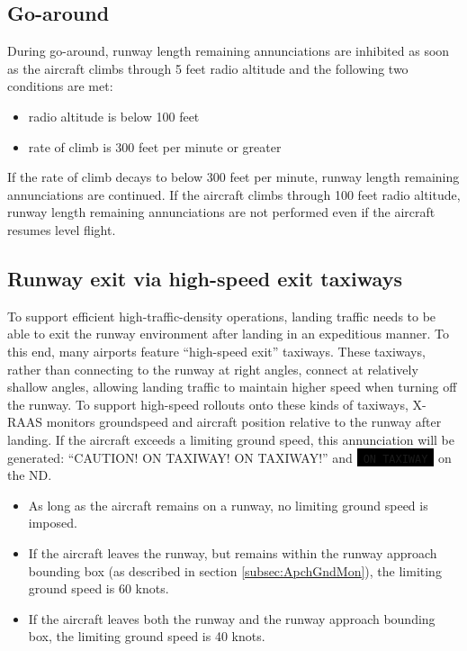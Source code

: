 \documentclass[a4paper,12pt]{article}
\newcommand{\visualadvisory}[3][b]{%
    \ifthenelse{\equal{#1}{b}}{\begin{center}}{}
    \noindent
    \colorbox{black}{\textcolor{#2visualadvisorycolor}{\large\texttt{~#3~}}}
    \ifthenelse{\equal{#1}{b}}{\end{center}}{}}
\begin{document}
\subsection{Go-around}
\label{subsec:GoAround}

During go-around, runway length remaining annunciations are inhibited as
soon as the aircraft climbs through 5 feet radio altitude and the
following two conditions are met:

\begin{itemize}

\item radio altitude is below 100 feet

\item rate of climb is 300 feet per minute or greater

\end{itemize}

\noindent If the rate of climb decays to below 300 feet per minute,
runway length remaining annunciations are continued. If the aircraft
climbs through 100 feet radio altitude, runway length remaining
annunciations are not performed even if the aircraft resumes level
flight.

\subsection{Runway exit via high-speed exit taxiways}
\label{subsec:HighSpeedExit}

To support efficient high-traffic-density operations, landing traffic
needs to be able to exit the runway environment after landing in an
expeditious manner. To this end, many airports feature ``high-speed
exit'' taxiways. These taxiways, rather than connecting to the runway at
right angles, connect at relatively shallow angles, allowing landing
traffic to maintain higher speed when turning off the runway. To support
high-speed rollouts onto these kinds of taxiways, X-RAAS monitors
groundspeed and aircraft position relative to the runway after landing.
If the aircraft exceeds a limiting ground speed, this annunciation will
be generated: ``CAUTION! ON TAXIWAY! ON TAXIWAY!'' and
\visualadvisory[i]{nonroutine}{ON TAXIWAY} on the ND.

\begin{itemize}

\item As long as the aircraft remains on a runway, no limiting ground
speed is imposed.

\item If the aircraft leaves the runway, but remains within the runway
approach bounding box (as described in section \ref{subsec:ApchGndMon}),
the limiting ground speed is 60 knots.

\item If the aircraft leaves both the runway and the runway approach
bounding box, the limiting ground speed is 40 knots.

\end{itemize}
\end{document}
